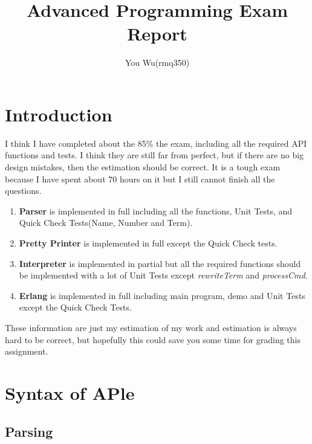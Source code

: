 \documentclass[11pt]{article}
\begin{document}
\title{Advanced Programming Exam Report}
\author{You Wu(rmq350)}
\maketitle

\section{Introduction}

I think I have completed about the 85\% the exam, including all the required API functions and tests. I think they are still far from perfect, but if there are no big design mistakes, then the estimation should be correct. It is a tough exam because I have spent about 70 hours on it but I still cannot finish all the questions. 

\begin{enumerate}
\item \textbf{Parser} is implemented in full including all the functions, Unit Tests, and Quick Check Tests(Name, Number and Term).

\item \textbf{Pretty Printer} is implemented in full except the Quick Check tests.  

\item \textbf{Interpreter} is implemented in partial but all the required functions should be implemented with a lot of Unit Tests except \textit{rewriteTerm} and \textit{processCmd}. 

\item \textbf{Erlang} is implemented in full including main program, demo and Unit Tests except the Quick Check Tests.

\end{enumerate}

These information are just my estimation of my work and estimation is always hard to be correct, but hopefully this could save you some time for grading this assignment.

\section{Syntax of APle}

\subsection{Parsing}
\end{document}
